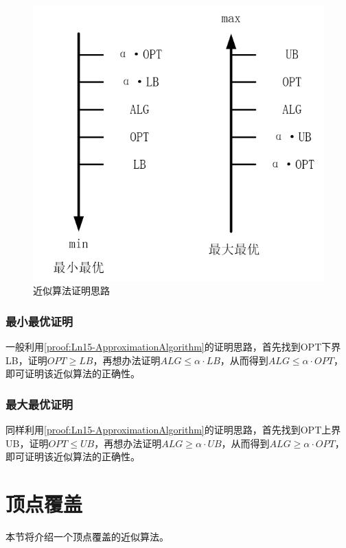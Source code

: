 \begin{figure}[htb]
	\centering
	\includegraphics[scale=0.3]{image/Ln15-ApproximationAlgorithm1.png}
	\caption{近似算法证明思路} \label{proof:Ln15-ApproximationAlgorithm}
\end{figure}

\subsubsection{最小最优证明}
一般利用\autoref{proof:Ln15-ApproximationAlgorithm}的证明思路，首先找到OPT下界LB，证明$OPT\geqslant LB$，再想办法证明$ALG\leqslant \alpha \cdot LB$，从而得到$ALG\leqslant \alpha \cdot OPT$，即可证明该近似算法的正确性。
\subsubsection{最大最优证明}
同样利用\autoref{proof:Ln15-ApproximationAlgorithm}的证明思路，首先找到OPT上界UB，证明$OPT\leqslant UB$，再想办法证明$ALG\geqslant \alpha \cdot UB$，从而得到$ALG\geqslant \alpha \cdot OPT$，即可证明该近似算法的正确性。



\section{顶点覆盖}

本节将介绍一个顶点覆盖的近似算法。

